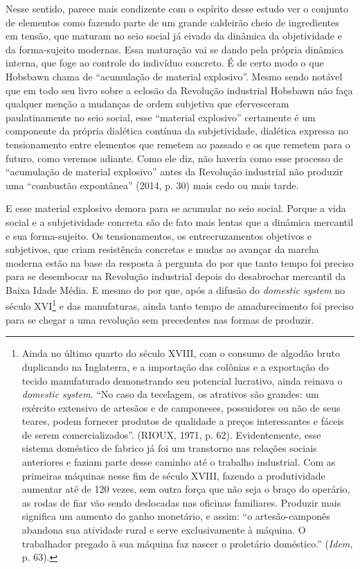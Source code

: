 Nesse sentido, parece mais condizente com o espírito desse estudo ver o
conjunto de elementos como fazendo parte de um grande caldeirão cheio de
ingredientes em tensão, que maturam no seio social já eivado da dinâmica
da objetividade e da forma-sujeito modernas. Essa maturação vai se dando
pela própria dinâmica interna, que foge ao controle do indivíduo
concreto. É de certo modo o que Hobsbawn chama de ``acumulação de
material explosivo''. Mesmo sendo notável que em todo seu livro sobre a
eclosão da Revolução industrial Hobsbawn não faça qualquer menção a
mudanças de ordem subjetiva que efervesceram paulatinamente no seio
social, esse ``material explosivo'' certamente é um componente da
própria dialética contínua da subjetividade, dialética expressa no
tensionamento entre elementos que remetem ao passado e os que remetem
para o futuro, como veremos adiante. Como ele diz, não haveria como esse
processo de ``acumulação de material explosivo'' antes da Revolução
industrial não produzir uma ``combustão expontânea'' (2014, p. 30) mais
cedo ou mais tarde.

E esse material explosivo demora para se acumular no seio social. Porque
a vida social e a subjetividade concreta são de fato mais lentas que a
dinâmica mercantil e sua forma-sujeito. Os tensionamentos, os
entrecruzamentos objetivos e subjetivos, que criam resistência concretas
e mudas ao avançar da marcha moderna estão na base da resposta à
pergunta do por que tanto tempo foi preciso para se desembocar na
Revolução industrial depois do desabrochar mercantil da Baixa Idade
Média. E mesmo do por que, após a difusão do \emph{domestic system} no
século XVI\footnote{Ainda no último quarto do século XVIII, com o
  consumo de algodão bruto duplicando na Inglaterra, e a importação das
  colônias e a exportação do tecido manufaturado demonstrando seu
  potencial lucrativo, ainda reinava o \emph{domestic} \emph{system}.
  ``No caso da tecelagem, os atrativos são grandes: um exército
  extensivo de artesãos e de camponeses, possuidores ou não de seus
  teares, podem fornecer produtos de qualidade a preços interessantes e
  fáceis de serem comercializados''. (RIOUX, 1971, p. 62).
  Evidentemente, esse sistema doméstico de fabrico já foi um transtorno
  nas relações sociais anteriores e faziam parte desse caminho até o
  trabalho industrial. Com as primeiras máquinas nesse fim de século
  XVIII, fazendo a produtividade aumentar até de 120 vezes, sem outra
  força que não seja o braço do operário, as rodas de fiar vão sendo
  deslocadas nas oficinas familiares. Produzir mais significa um aumento
  do ganho monetário, e assim: ``o artesão-camponês abandona sua
  atividade rural e serve exclusivamente à máquina. O trabalhador
  pregado à sua máquina faz nascer o proletário doméstico.''
  (\emph{Idem,} p. 63).} e das manufaturas, ainda tanto tempo de
amadurecimento foi preciso para se chegar a uma revolução sem
precedentes nas formas de produzir.

